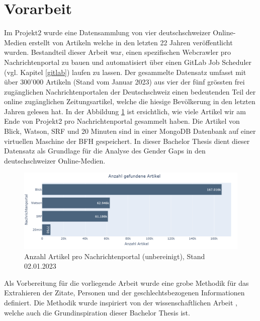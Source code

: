 \section{Vorarbeit}
Im Projekt2  \cite{project2} wurde eine Datensammlung von vier deutschschweizer Online-Medien erstellt von Artikeln welche in den letzten 22 Jahren veröffentlicht wurden.
Bestandteil dieser Arbeit war, einen spezifischen Webcrawler pro Nachrichtenportal zu bauen und automatisiert über einen GitLab Job Scheduler (vgl. Kapitel \ref{gitlab}) laufen zu lassen.
Der gesammelte Datensatz umfasst mit über 300'000 Artikeln (Stand vom Januar 2023) aus vier der fünf grössten frei zugänglichen Nachrichtenportalen \cite{statista-nachrichtenportale-marktanteil}
der Deutschschweiz einen bedeutenden Teil der online zugänglichen Zeitungsartikel, welche die hiesige Bevölkerung in den letzten Jahren
gelesen hat. In der Abbildung \ref{p2-count-articles} ist ersichtlich, wie viele Artikel wir am Ende von Projekt2 pro Nachrichtenportal gesammelt haben.
Die Artikel von Blick, Watson, SRF und 20 Minuten sind in einer MongoDB Datenbank auf einer virtuellen Maschine der BFH gespeichert.
In dieser Bachelor Thesis dient dieser Datensatz als Grundlage für die Analyse des Gender Gaps in den deutschschweizer Online-Medien.

\begin{figure}[H]
	\begin{center}
        \centering
		\includegraphics[width=1\linewidth]{./images/sum_all_2015-20230102.png}
		\caption{Anzahl Artikel pro Nachrichtenportal (unbereinigt), Stand 02.01.2023}
		\label{p2-count-articles}
	\end{center}
\end{figure}

Als Vorbereitung für die vorliegende Arbeit wurde eine grobe Methodik für das Extrahieren der Zitate, 
Personen und der geschlechtsbezogenen Informationen definiert. 
Die Methodik wurde inspiriert von der wissenschaftlichen Arbeit  \cite{gender_gap_tracker}, 
welche auch die Grundinspiration dieser Bachelor Thesis ist.
